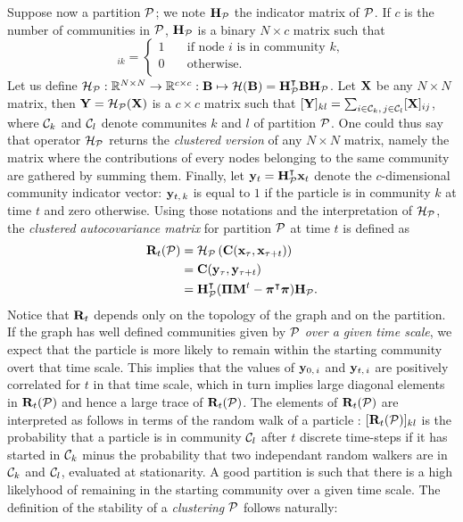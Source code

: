 Suppose now a partition $\P$; we note $\b H_{\P}$ the indicator matrix of $\P$. If $c$ is the number of communities in $\P$, $\b H_{\P}$ is a binary $N \times c$ matrix such that 
\begin{equation}
	[\b H_{\P}]_{ik} = 
	\begin{cases}
		1  & \quad \mbox{if node $i$ is in community $k$},\\
	    0  & \quad \text{otherwise}.\\
	\end{cases}
\end{equation}
Let us define $\mathcal{H}_{\P} : \R[N \times N] \rightarrow \R[c \times c] : \b B \mapsto \mathcal{H}(\b B) = \b H_{\P}^{\t} \b B \b H_{\P}$. Let $\b X$ be any $N \times N$ matrix, then $\b Y = \mathcal{H}_{\P}(\b X)$ is a $c \times c$ matrix such that $[\b Y]_{kl} = \sum_{i \in \C_k,\, j \in \C_l} [\b X]_{ij}$, where $\C_k$ and $\C_l$ denote communites $k$ and $l$ of partition $\P$. One could thus say that operator $\mathcal{H}_{\P}$ returns the \textit{clustered version} of any $N \times N$ matrix, namely the matrix where the contributions of every nodes belonging to the same community are gathered by summing them. Finally, let $\b y_t = \b H_{\P}^{\t} \b x_t$ denote the $c$-dimensional community indicator vector: $\b y_{t,\,k}$ is equal to $1$ if the particle is in community $k$ at time $t$ and zero otherwise.
Using those notations and the interpretation of $\mathcal{H}_{\P} $, the \textit{clustered autocovariance matrix} for partition $\P$ at time $t$ is defined as
\begin{align}
	\b R_t(\P) &= \mathcal{H}_{\P}\left(\b C(\b x_\tau,\b x_{\tau+t})\right)\\
		&= \b C(\b y_\tau,\b y_{\tau+t})\\
		&= \b H_{\P}^{\t}(\b \Pi\b M^t - \bs \pi^{\t}\bs \pi)\b H_{\P}.
\end{align}
Notice that $\b R_t$ depends only on the topology of the graph and on the partition. If the graph has well defined communities given by $\P$ \textit{over a given time scale}, we expect that the particle is more likely to remain within the starting community overt that time scale. This implies that the values of $\b y_{0,\,i}$ and $\b y_{t,\,i}$ are positively correlated for $t$ in that time scale, which in turn implies large diagonal elements in $\b R_t(\P)$ and hence a large trace of $\b R_t(\P)$. The elements of $\b R_t(\P)$ are interpreted as follows in terms of the random walk of a particle : $[\b R_t(\P)]_{kl}$ is the probability that a particle is in community $\C_l$ after $t$ discrete time-steps if it has started in $\C_k$ minus the probability that two independant random walkers are in $\C_k$ and $\C_l$, evaluated at stationarity. A good partition is such that there is a high likelyhood of remaining in the starting community over a given time scale. The definition of the stability of a \textit{clustering} $\P$ follows naturally:
